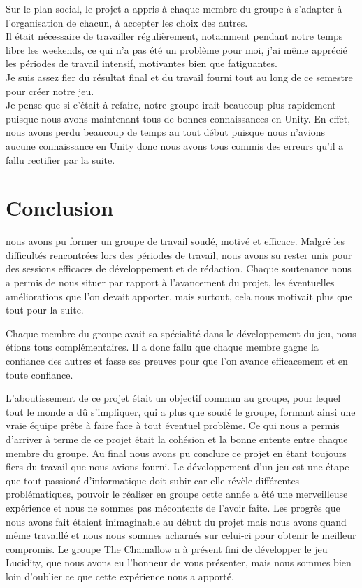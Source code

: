 \documentclass[a4paper , 12pt]{article}
\begin{document}
Sur le plan social, le projet a appris à chaque membre du groupe à s’adapter à l’organisation de chacun, à accepter les choix des autres.\\

Il était nécessaire de travailler régulièrement, notamment pendant notre temps libre les weekends, ce qui n’a pas été un problème pour moi, j’ai même apprécié les périodes de travail intensif, motivantes bien que fatiguantes.\\

Je suis assez fier du résultat final et du travail fourni tout au long de ce semestre pour créer notre jeu. \\

Je pense que si c’était à refaire, notre groupe irait beaucoup plus rapidement puisque nous avons maintenant tous de bonnes connaissances en Unity. En effet, nous avons perdu beaucoup de temps au tout début puisque nous n’avions aucune connaissance en Unity donc nous avons tous commis des erreurs qu’il a fallu rectifier par la suite.


\quad

\newpage
 
\section{Conclusion}

\quad

nous avons pu former un groupe de travail soudé, motivé et efficace. Malgré les difficultés rencontrées lors des périodes de travail, nous avons su rester unis pour des sessions efficaces de développement et de rédaction. Chaque soutenance nous a permis de nous situer par rapport à l’avancement du projet, les éventuelles améliorations que l’on devait apporter, mais surtout, cela nous motivait plus que tout pour la suite. 

Chaque membre du groupe avait sa spécialité dans le développement du jeu, nous étions tous complémentaires. Il a donc fallu que chaque membre gagne la confiance des autres et fasse ses preuves pour que l’on avance efficacement et en toute confiance. 

L’aboutissement de ce projet était un objectif commun au groupe, pour lequel tout le monde a dû s’impliquer, qui a plus que soudé le groupe, formant ainsi une vraie équipe prête à faire face à tout éventuel problème. Ce qui nous a permis d’arriver à terme de ce projet était la cohésion et la bonne entente entre chaque membre du groupe. Au final nous avons pu conclure ce projet en étant toujours fiers du travail que nous avions fourni. Le développement d’un jeu est une étape que tout passioné d’informatique doit subir car elle révèle différentes problématiques, pouvoir le réaliser en groupe cette année a été une merveilleuse expérience et nous ne sommes pas mécontents de l’avoir faite. Les progrès que nous avons fait étaient inimaginable au début du projet mais nous avons quand même travaillé et nous nous sommes acharnés sur celui-ci pour obtenir le meilleur compromis. Le groupe The Chamallow a à présent fini de développer le jeu Lucidity, que nous avons eu l’honneur de vous présenter, mais nous sommes bien loin d’oublier ce que cette expérience nous a apporté. 
\quad
\end{document}
